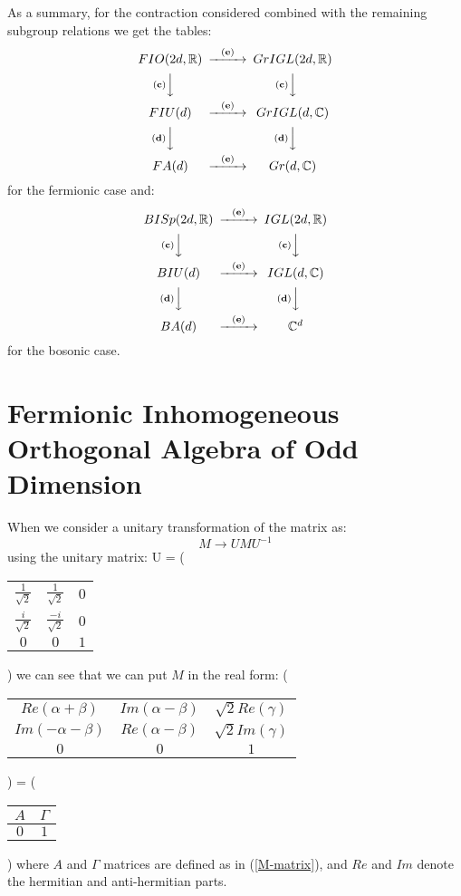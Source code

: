 As a summary, for the contraction considered combined with the
remaining subgroup relations we get the tables:
\[
\begin{CD}
{FIO(2d, \IR)} @>{\bf (e)}>> {GrIGL(2d, \IR)} \\
@V{\bf (c)}VV @V{\bf (c)}VV \\
{FIU(d)} @>{\bf (e)}>> {GrIGL(d, \IC)} \\
@V{\bf (d)}VV @V{\bf (d)}VV \\
{FA(d)} @>{\bf (e)}>> {Gr(d, \IC)}
\end{CD}
\]
for the fermionic case and:
\[
\begin{CD}
{BISp(2d, \IR)} @>{\bf (e)}>> {IGL(2d, \IR)} \\
@V{\bf (c)}VV @V{\bf (c)}VV \\
{BIU(d)} @>{\bf (e)}>> {IGL(d, \IC)} \\
@V{\bf (d)}VV @V{\bf (d)}VV \\
{BA(d)} @>{\bf (e)}>> {\IC^d}
\end{CD}
\]
for the bosonic case.

\section{Fermionic Inhomogeneous
Orthogonal Algebra of Odd Dimension}
When we consider a unitary transformation of the \FIO matrix as:
\[
M \rightarrow UMU^{-1}
\]
using the unitary matrix: \beq U = \left(
\begin{tabular}{cc|c}
$\frac{1}{\sqrt{2}}$ & $\frac{1}{\sqrt{2}}$ & $0$ \\
$\frac{i}{\sqrt{2}}$ & $\frac{-i}{\sqrt{2}}$ & $0$ \\
\hline $0$ & $0$ & $1$
\end{tabular}
\right) \eeq we can see that we can put $M$ in the real form: \beq
\left(
\begin{tabular}{cc|c}
$Re(\alpha + \beta)$ & $Im(\alpha - \beta)$ & $\sqrt{2}Re(\gamma)$ \\
$Im(-\alpha - \beta)$ & $Re(\alpha - \beta)$ & $\sqrt{2}Im(\gamma)$ \\
\hline $0$ & $0$ & $1$
\end{tabular}
\right) = \left(
\begin{tabular}{c|c}
$A$ & $\Gamma$ \\
\hline $0$ & $1$
\end{tabular}
\right) \eeq where $A$ and $\Gamma$ matrices are defined as in
(\ref{M-matrix}), and $Re$ and $Im$ denote the hermitian and
anti-hermitian parts.

